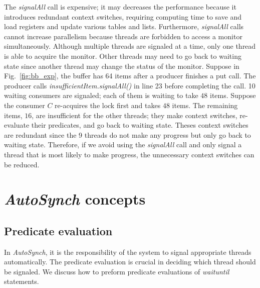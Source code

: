 \documentclass[preprint]{sigplanconf}
\begin{document}
The {\em signalAll} call is expensive; it may decreases the performance because 
it introduces redundant context switches, requiring 
computing time to save and load registers and update various tables and lists.
Furthermore, {\em signalAll} calls cannot increase parallelism because threads
are forbidden to access a monitor simultaneously. Although multiple threads are
signaled at a time, only one thread is able to acquire the monitor. Other 
threads may need to go back to waiting state since another thread may change 
the status of the monitor. Suppose in Fig.~\ref{fig:bb_exp}, the 
buffer has 64 items after a producer finishes a put call. The producer calls 
{\em insufficientItem.signalAll()} in line 23 before completing the call. 10  
waiting consumers are signaled; each of them is waiting to take $48$ items.
Suppose the consumer $C$ re-acquires the lock first and takes $48$ items. The
remaining items, $16$, are insufficient for the other threads; they
make context switches, re-evaluate their predicates, and go back to waiting 
state. Theses context switches are redundant since the 9 threads do not 
make any progress but only go back to waiting state. 
Therefore, if we avoid using the {\em signalAll} call and only signal a thread that 
is most likely to make progress, the unnecessary context switches can be
reduced.



\section{{\em AutoSynch} concepts} \label{sec:concept}


\subsection{Predicate evaluation} \label{sec:globalization}
In {\em AutoSynch}, it is the responsibility of the system to signal appropriate 
threads automatically. The predicate evaluation is crucial in deciding which
thread should be signaled. We discuss how to preform predicate evaluations
of {\em waituntil} statements. 
\end{document}
